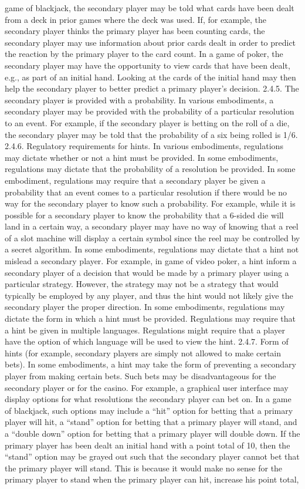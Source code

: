 \documentclass[11pt,a4paper]{article}
\begin{document}
game of blackjack, the secondary player may be told what cards have been dealt from a deck in prior games where the deck was used. If, for example, the secondary player thinks the primary player has been counting cards, the secondary player may use information about prior cards dealt in order to predict the reaction by the primary player to the card count. In a game of poker, the secondary player may have the opportunity to view cards that have been dealt, e.g., as part of an initial hand. Looking at the cards of the initial hand may then help the secondary player to better predict a primary player's decision. 2.4.5. The secondary player is provided with a probability. In various embodiments, a secondary player may be provided with the probability of a particular resolution to an event. For example, if the secondary player is betting on the roll of a die, the secondary player may be told that the probability of a six being rolled is 1/6. 2.4.6. Regulatory requirements for hints. In various embodiments, regulations may dictate whether or not a hint must be provided. In some embodiments, regulations may dictate that the probability of a resolution be provided. In some embodiment, regulations may require that a secondary player be given a probability that an event comes to a particular resolution if there would be no way for the secondary player to know such a probability. For example, while it is possible for a secondary player to know the probability that a 6-sided die will land in a certain way, a secondary player may have no way of knowing that a reel of a slot machine will display a certain symbol since the reel may be controlled by a secret algorithm. In some embodiments, regulations may dictate that a hint not mislead a secondary player. For example, in game of video poker, a hint inform a secondary player of a decision that would be made by a primary player using a particular strategy. However, the strategy may not be a strategy that would typically be employed by any player, and thus the hint would not likely give the secondary player the proper direction. In some embodiments, regulations may dictate the form in which a hint must be provided. Regulations may require that a hint be given in multiple languages. Regulations might require that a player have the option of which language will be used to view the hint. 2.4.7. Form of hints (for example, secondary players are simply not allowed to make certain bets). In some embodiments, a hint may take the form of preventing a secondary player from making certain bets. Such bets may be disadvantageous for the secondary player or for the casino. For example, a graphical user interface may display options for what resolutions the secondary player can bet on. In a game of blackjack, such options may include a “hit” option for betting that a primary player will hit, a “stand” option for betting that a primary player will stand, and a “double down” option for betting that a primary player will double down. If the primary player has been dealt an initial hand with a point total of 10, then the “stand” option may be grayed out such that the secondary player cannot bet that the primary player will stand. This is because it would make no sense for the primary player to stand when the primary player can hit, increase his point total, 
\end{document}
